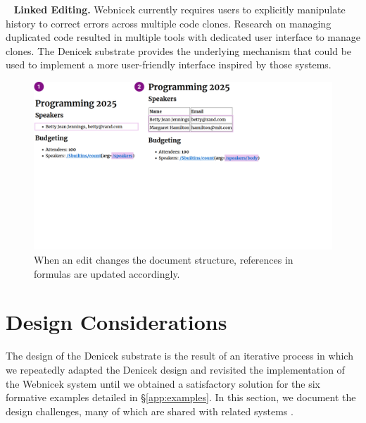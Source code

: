 \documentclass[sigconf,anonymous,screen]{acmart}
\DeclareRobustCommand{\keyideabox}[3]{\begin{tcolorbox}[breakable,
  boxsep=5pt,left=0pt,right=0pt,top=0pt,bottom=0pt,width=\dimexpr\columnwidth\relax,
  colback=gray!20,colframe=gray!20,
  enlarge bottom by=0pt,enlarge top by=0pt,
  arc=0pt,outer arc=0pt]
\lettrine[lraise=0.3]{\LARGE #1}{~}
\small \textbf{#2.} #3
\end{tcolorbox}
}
\begin{document}
\keyideabox{\faClipboard}{Linked Editing}{Webnicek currently requires users to explicitly
manipulate history to correct errors across multiple code clones. Research on managing duplicated
code resulted in multiple tools \cite{toomim-2004-linked,duala-ekoko-2008-clone} with dedicated
user interface to manage clones. The Denicek substrate provides the underlying mechanism that
could be used to implement a more user-friendly interface inspired by those systems.}


\begin{figure}[t]
\vspace{-0.5em}
\includegraphics[width=0.9\columnwidth,clip,trim=0cm 9.5cm 8cm 0cm]{fig/coevolution.pdf}
\vspace{-1em}
\caption{When an edit changes the document structure, references in formulas are updated accordingly.}
\label{fig:coevolution}
\vspace{-0.5em}
\end{figure}


\section{Design Considerations}
\label{sec:discuss}

The design of the Denicek substrate is the result of an iterative process in which we repeatedly
adapted the Denicek design and revisited the implementation of the Webnicek system until we obtained
a satisfactory solution for the six formative examples detailed in \S\ref{app:examples}. In this
section, we document the design challenges, many of which are shared with related systems
\cite{jakubovic-2022-ladder,edwards-2005-subtext,hall-2017-infra,omar-2021-livelits}.
\end{document}
